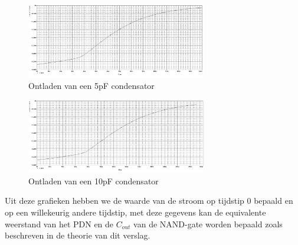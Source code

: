 \documentclass{article}
\begin{document}
\begin{figure}[H]
	\centering
	\includegraphics[width=0.7\textwidth]{ontladen5p}
	\caption{Ontladen van een 5pF condensator}
\end{figure}

\begin{figure}[H]
	\centering
	\includegraphics[width=0.7\textwidth]{ontladen10p}
	\caption{Ontladen van een 10pF condensator}
\end{figure}

Uit deze grafieken hebben we de waarde van de stroom op tijdstip 0 bepaald en op een willekeurig andere tijdstip, met deze gegevens kan de equivalente weerstand van het PDN en de $C_{out}$ van de NAND-gate worden bepaald zoals beschreven in de theorie van dit verslag.
\end{document}
